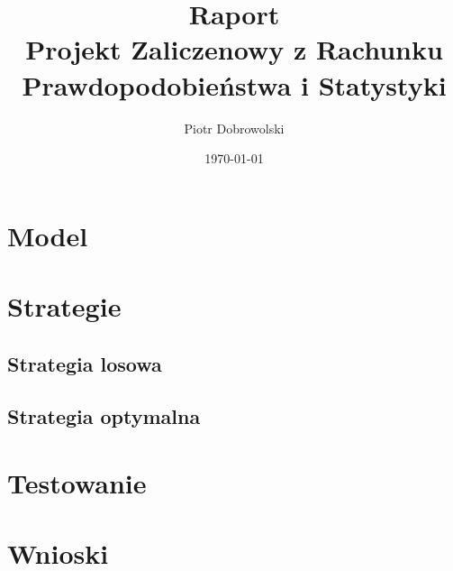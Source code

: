 \documentclass{article}
\author{Piotr Dobrowolski}
\title{Raport \\{\small Projekt Zaliczenowy z Rachunku Prawdopodobieństwa i Statystyki} }
\date{\today}
\begin{document}
\maketitle
\tableofcontents
\section{Model}
\section{Strategie}
\subsection{Strategia losowa}
\subsection{Strategia optymalna}
\section{Testowanie}
\section{Wnioski}
\end{document}
